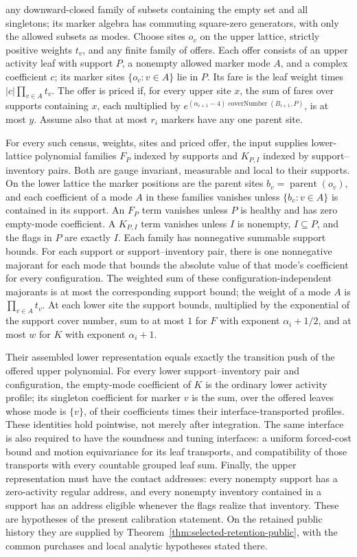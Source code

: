 any downward-closed family of subsets containing the empty set and all
singletons; its marker algebra has commuting square-zero generators, with
only the allowed subsets as modes. Choose sites $o_v$ on the upper lattice,
strictly positive weights $t_v$, and any finite family of offers. Each
offer consists of an upper activity leaf with support $P$, a nonempty
allowed marker mode $A$, and a complex coefficient $c$; its marker sites
$\{o_v:v\in A\}$ lie in $P$. Its fare is the leaf weight times
$|c|\prod_{v\in A}t_v$. The offer is priced if, for every upper site $x$,
the sum of fares over supports containing $x$, each multiplied by
$e^{(\alpha_{i+1}-4)\operatorname{coverNumber}(B_{i+1},P)}$, is at
most $y$. Assume also that at most $r_i$ markers have any one parent
site.

For every such census, weights, sites and priced offer, the input supplies
lower-lattice polynomial families $F_P$ indexed by supports and $K_{P,I}$
indexed by support--inventory pairs. Both are gauge invariant, measurable
and local to their supports. On the lower lattice the marker positions are
the parent sites $b_v=\operatorname{parent}(o_v)$, and each coefficient of a
mode $A$ in these families vanishes unless $\{b_v:v\in A\}$ is contained in
its support. An $F_P$ term vanishes unless $P$ is healthy and has zero
empty-mode coefficient. A $K_{P,I}$ term vanishes unless $I$ is nonempty,
$I\subseteq P$, and the flags in $P$ are exactly $I$. Each family has
nonnegative summable support bounds. For each support or support--inventory
pair, there is one nonnegative majorant for each mode that bounds the
absolute value of that mode's coefficient for every configuration. The
weighted sum of these configuration-independent majorants is at most the
corresponding support bound; the weight of a mode $A$ is
$\prod_{v\in A}t_v$. At each lower site the
support bounds, multiplied by the exponential of the support cover
number, sum to at most $1$ for $F$ with exponent $\alpha_i+1/2$, and at
most $w$ for $K$ with exponent $\alpha_i+1$.

Their assembled lower representation equals exactly the transition push
of the offered upper polynomial. For every lower support--inventory pair
and configuration, the empty-mode coefficient of $K$ is the ordinary
lower activity profile; its singleton coefficient for marker $v$ is the
sum, over the offered leaves whose mode is $\{v\}$, of their coefficients
times their interface-transported profiles. These identities hold pointwise,
not merely after integration. The same interface is also required to have the
soundness and tuning interfaces: a uniform forced-cost bound and motion
equivariance for its leaf transports, and compatibility of those
transports with every countable grouped leaf sum. Finally, the upper
representation must have the contact addresses: every nonempty support
has a zero-activity regular address, and every nonempty inventory contained
in a support has an address eligible whenever the flags realize that
inventory. These are hypotheses of the present calibration statement. On the
retained public history they are supplied by
Theorem~\ref{thm:selected-retention-public}, with the common purchases
and local analytic hypotheses stated there.

